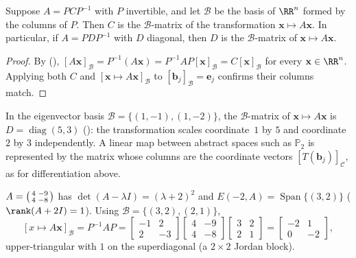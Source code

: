 \documentclass[10pt]{scrartcl}
\newcommand{\vv}[1]{\mathbf{#1}}
\DeclareMathOperator{\spn}{Span}\DeclareMathOperator{\Nul}{Nul}\DeclareMathOperator{\Col}{Col}\DeclareMathOperator{\Row}{Row}\DeclareMathOperator{\tr}{tr}
\begin{document}
\begin{theorem*}
  Suppose $A=PCP^{-1}$ with $P$ invertible, and let $\mathcal B$ be the basis of $\RR^n$ formed by the columns of $P$. Then $C$ is the $\mathcal B$-matrix of the transformation $\vv x\mapsto A\vv x$. In particular, if $A=PDP^{-1}$ with $D$ diagonal, then $D$ is the $\mathcal B$-matrix of $\vv x\mapsto A\vv x$.
\end{theorem*}
\begin{proof}
  By (), $[A\vv x]_{\mathcal B}=P^{-1}(A\vv x) = P^{-1}AP[\vv x]_{\mathcal B} = C[\vv x]_{\mathcal B}$ for every $\vv x\in\RR^n$. Applying both $C$ and $[\vv x\mapsto A\vv x]_{\mathcal B}$ to $[\vv b_j]_{\mathcal B}=\vv e_j$ confirms their columns match.
\end{proof}

\revisit In the eigenvector basis $\mathcal B=\{(1,-1),(1,-2)\}$, the $\mathcal B$-matrix of $\vv x\mapsto A\vv x$ is $D=\operatorname{diag}(5,3)$ (): the transformation scales coordinate~$1$ by $5$ and coordinate~$2$ by $3$ independently. A linear map between abstract spaces such as $\mathbb P_2$ is represented by the matrix whose columns are the coordinate vectors $[T(\vv b_j)]_{\mathcal C}$, as for differentiation above.

\begin{example*}
  $A=\begin{psmallmatrix}4&-9\\4&-8\end{psmallmatrix}$ has $\det(A-\lambda I)=(\lambda+2)^2$ and $E(-2,A)=\spn\{(3,2)\}$ ($\rank(A+2I)=1$). Using $\mathcal B=\{(3,2),(2,1)\}$,
  \[
    [x\mapsto A\vv x]_{\mathcal B} = P^{-1}AP = \begin{bmatrix}-1&2\\2&-3\end{bmatrix}\begin{bmatrix}4&-9\\4&-8\end{bmatrix}\begin{bmatrix}3&2\\2&1\end{bmatrix} = \begin{bmatrix}-2&1\\0&-2\end{bmatrix},
  \]
  upper-triangular with $1$ on the superdiagonal (a $2\times 2$ Jordan block).
\end{example*}
\end{document}
